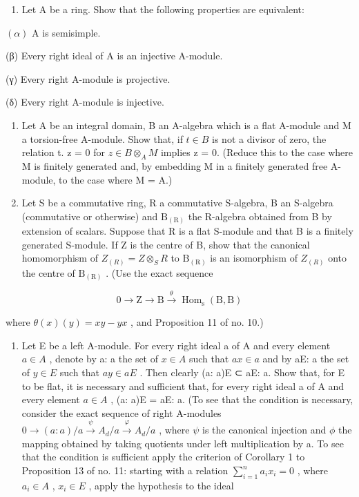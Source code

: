 \begin{enumerate}
\def\labelenumi{\arabic{enumi}.}
\setcounter{enumi}{18}
\tightlist
\item
  Let A be a ring. Show that the following properties are equivalent:
\end{enumerate}

\((\alpha)\) A is semisimple.

(β) Every right ideal of A is an injective A-module.

(γ) Every right A-module is projective.

(δ) Every right A-module is injective.

\begin{enumerate}
\def\labelenumi{\arabic{enumi}.}
\setcounter{enumi}{19}
\item
  Let A be an integral domain, B an A-algebra which is a flat A-module and M a torsion-free A-module. Show that, if \(t \in B\) is not a divisor of zero, the relation t. z = 0 for \(z \in B \otimes_{A} M\) implies z = 0. (Reduce this to the case where M is finitely generated and, by embedding M in a finitely generated free A-module, to the case where M = A.)
\item
  Let S be a commutative ring, R a commutative S-algebra, B an S-algebra (commutative or otherwise) and \(\mathrm{B}_{(\mathrm{R})}\) the R-algebra obtained from B by extension of scalars. Suppose that R is a flat S-module and that B is a finitely generated S-module. If Z is the centre of B, show that the canonical homomorphism of \(Z_{(R)} = Z \otimes_{S} R\) to \(\mathrm{B}_{(\mathrm{R})}\) is an isomorphism of \(Z_{(R)}\) onto the centre of \(\mathrm{B}_{(\mathrm{R})}\) . (Use the exact sequence
\end{enumerate}

\[
0 \longrightarrow \mathrm{Z} \longrightarrow \mathrm{B} \stackrel {\theta} {\longrightarrow} \operatorname{Hom} _ {\mathrm{s}} (\mathrm{B}, \mathrm{B})
\]

where \(\theta (x)(y) = xy - yx\) , and Proposition 11 of no. 10.)

\begin{enumerate}
\def\labelenumi{\arabic{enumi}.}
\setcounter{enumi}{21}
\tightlist
\item
  Let E be a left A-module. For every right ideal a of A and every element \(a \in A\) , denote by a: a the set of \(x \in A\) such that \(ax \in a\) and by aE: a the set of \(y \in E\) such that \(ay \in aE\) . Then clearly (a: a)E ⊂ aE: a. Show that, for E to be flat, it is necessary and sufficient that, for every right ideal a of A and every element \(a \in A\) , (a: a)E = aE: a. (To see that the condition is necessary, consider the exact sequence of right A-modules \(0 \to (a: a)/a \stackrel{\psi}{\to} A_d/a \stackrel{\varphi}{\to} A_d/a\) , where \(\psi\) is the canonical injection and \(\phi\) the mapping obtained by taking quotients under left multiplication by a. To see that the condition is sufficient apply the criterion of Corollary 1 to Proposition 13 of no. 11: starting with a relation \(\sum_{i=1}^{n} a_i x_i = 0\) , where \(a_i \in A\) , \(x_i \in E\) , apply the hypothesis to the ideal
\end{enumerate}


